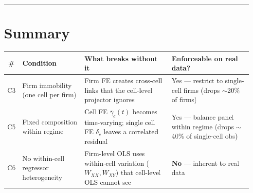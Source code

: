 \documentclass{article}
\theoremstyle{plain}
\theoremstyle{definition}
\begin{document}
\bigskip
\hrule
\bigskip

\section{Summary}

\begin{center}
\renewcommand{\arraystretch}{1.4}
\begin{tabular}{c p{3.5cm} p{4.5cm} p{3.5cm}}
\hline
\textbf{\#} & \textbf{Condition} & \textbf{What breaks without it} & \textbf{Enforceable on real data?} \\
\hline
C3 & Firm immobility (one cell per firm) &
  Firm FE creates cross-cell links that the cell-level projector ignores &
  Yes --- restrict to single-cell firms (drops $\sim$20\% of firms) \\[4pt]
C5 & Fixed composition within regime &
  Cell FE $\bar\gamma_c(t)$ becomes time-varying; single cell FE $\delta_c$
  leaves a correlated residual &
  Yes --- balance panel within regime (drops $\sim$40\% of single-cell obs) \\[4pt]
C6 & No within-cell regressor heterogeneity &
  Firm-level OLS uses within-cell variation ($W_{XX}, W_{XY}$) that cell-level
  OLS cannot see &
  \textbf{No} --- inherent to real data \\
\hline
\end{tabular}
\end{center}
\end{document}
